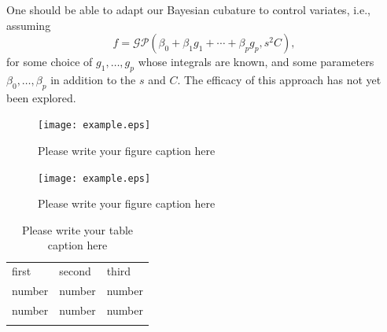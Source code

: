 \documentclass[twocolumn]{svjour3}          %
\begin{document}
One should be able to adapt our Bayesian cubature to control variates, i.e., assuming  
\begin{equation*}
f = \mathcal{GP} \left( \beta_0 + \beta_1 g_1 + \cdots + \beta_p g_p, s^2 C \right),
\end{equation*}
for some choice of $g_1, \ldots, g_p$ whose integrals are known, and some parameters $\beta_0, \ldots, \beta_p$ in addition to the $s$ and $C$.  The efficacy of this approach has not yet been explored.















\iffalse

\begin{figure}
  \texttt{[image: example.eps]}
\caption{Please write your figure caption here}
\label{fig:1}       %
\end{figure}
%
\begin{figure}
  \texttt{[image: example.eps]}
\caption{Please write your figure caption here}
\label{fig:2}       %
\end{figure}
%
\begin{table}
\caption{Please write your table caption here}
\label{tab:1}       %
\begin{tabular}{lll}
\hline\noalign{\smallskip}
first & second & third  \\
\noalign{\smallskip}\hline\noalign{\smallskip}
number & number & number \\
number & number & number \\
\noalign{\smallskip}\hline
\end{tabular}
\end{table}
\end{document}
